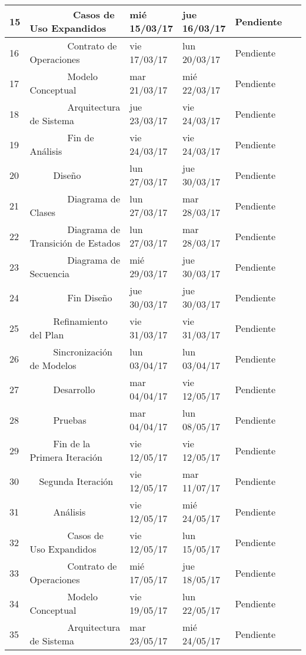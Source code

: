 \begin{center}
\begin{longtable}{ l l l l l l}
	15 &         Casos de Uso Expandidos & mié 15/03/17 & jue 16/03/17 & Pendiente & \  \\ \hline
	16 &         Contrato de Operaciones & vie 17/03/17 & lun 20/03/17 & Pendiente & \  \\ \hline
	17 &         Modelo Conceptual & mar 21/03/17 & mié 22/03/17 & Pendiente & \  \\ \hline
	18 &         Arquitectura de Sistema & jue 23/03/17 & vie 24/03/17 & Pendiente & \  \\ \hline
	19 &         Fin de Análisis & vie 24/03/17 & vie 24/03/17 & Pendiente & \  \\ \hline
	20 &      Diseño & lun 27/03/17 & jue 30/03/17 & Pendiente & \  \\ \hline
	21 &         Diagrama de Clases & lun 27/03/17 & mar 28/03/17 & Pendiente & \  \\ \hline
	22 &         Diagrama de Transición de Estados & lun 27/03/17 & mar 28/03/17 & Pendiente & \  \\ \hline
	23 &         Diagrama de Secuencia & mié 29/03/17 & jue 30/03/17 & Pendiente & \  \\ \hline
	24 &         Fin Diseño & jue 30/03/17 & jue 30/03/17 & Pendiente & \  \\ \hline
	25 &      Refinamiento del Plan & vie 31/03/17 & vie 31/03/17 & Pendiente & \  \\ \hline
	26 &      Sincronización de Modelos & lun 03/04/17 & lun 03/04/17 & Pendiente & \  \\ \hline
	27 &      Desarrollo & mar 04/04/17 & vie 12/05/17 & Pendiente & \  \\ \hline
	28 &      Pruebas & mar 04/04/17 & lun 08/05/17 & Pendiente & \  \\ \hline
	29 &      Fin de la Primera Iteración & vie 12/05/17 & vie 12/05/17 & Pendiente & \  \\ \hline
	30 &   Segunda Iteración & vie 12/05/17 & mar 11/07/17 & Pendiente & \  \\ \hline
	31 &      Análisis & vie 12/05/17 & mié 24/05/17 & Pendiente & \  \\ \hline
	32 &         Casos de Uso Expandidos & vie 12/05/17 & lun 15/05/17 & Pendiente & \  \\ \hline
	33 &         Contrato de Operaciones & mié 17/05/17 & jue 18/05/17 & Pendiente & \  \\ \hline
	34 &         Modelo Conceptual & vie 19/05/17 & lun 22/05/17 & Pendiente & \  \\ \hline
	35 &         Arquitectura de Sistema & mar 23/05/17 & mié 24/05/17 & Pendiente & \  \\ \hline

\end{longtable}
\end{center}
